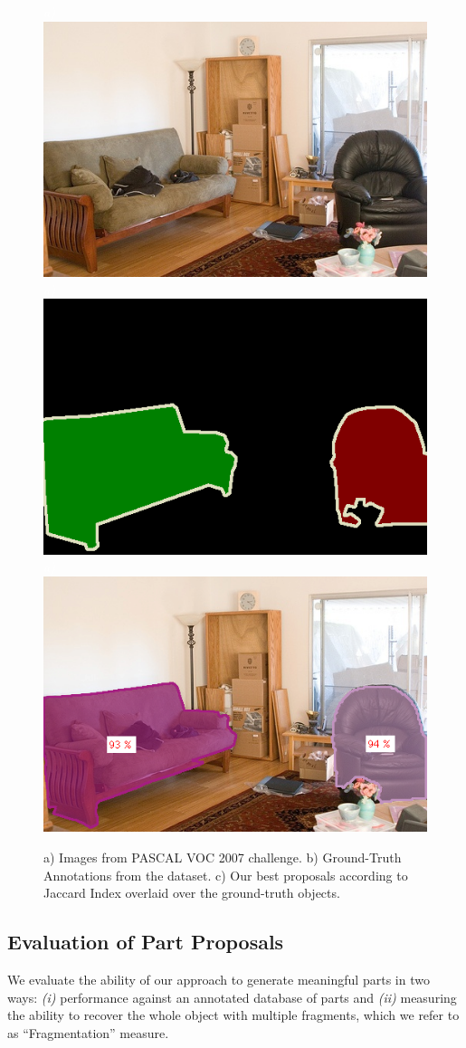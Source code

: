 \begin{figure}[!ht]
{\footnotesize\textit{\textcolor{white}{a)}}}\includegraphics[width=0.31\linewidth]{figs/009435_00.png}
{\footnotesize\textit{\textcolor{white}{a)}}}\includegraphics[width=0.31\linewidth]{figs/009435.png}
{\footnotesize\textit{\textcolor{white}{a)}}}\includegraphics[width=0.31\linewidth]{figs/009435_mvf.png}

\caption{a) Images from PASCAL VOC 2007 challenge. b) Ground-Truth Annotations from the dataset. c) Our best proposals according to Jaccard Index overlaid over the ground-truth objects. }
 \label{fig:voc_examples}
 \end{figure}

\clearpage
\subsection{Evaluation of Part Proposals}

We evaluate the ability of our approach to generate meaningful parts in two ways: \emph{(i)} performance against an annotated database of parts and \emph{(ii)} measuring the ability to recover the whole object with multiple fragments, which we refer to as ``Fragmentation'' measure. 

